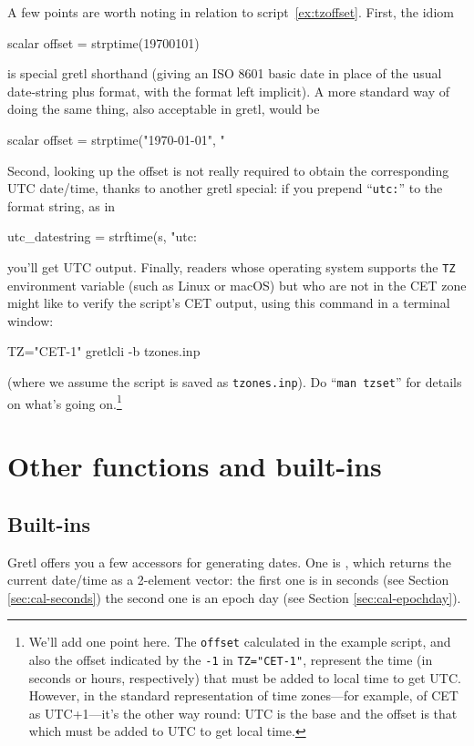 A few points are worth noting in relation to
script~\ref{ex:tzoffset}. First, the idiom
\begin{code}
scalar offset = strptime(19700101)
\end{code}
is special gretl shorthand (giving an ISO 8601 basic date in place of
the usual date-string plus format, with the format left implicit). A more
standard way of doing the same thing, also acceptable in gretl, would
be
\begin{code}
scalar offset = strptime("1970-01-01", "%
\end{code}
Second, looking up the offset is not really required to obtain the
corresponding UTC date/time, thanks to another gretl special: if you
prepend ``\texttt{utc:}'' to the format string, as in
\begin{code}
utc_datestring = strftime(s, "utc:%
\end{code}
you'll get UTC output. Finally, readers whose operating system
supports the \texttt{TZ} environment variable (such as Linux or macOS)
but who are not in the CET zone might like to verify the script's CET
output, using this command in a terminal window:
\begin{code}
TZ="CET-1" gretlcli -b tzones.inp
\end{code}
(where we assume the script is saved as \texttt{tzones.inp}). Do
``\texttt{man tzset}'' for details on what's going on.\footnote{We'll
  add one point here. The \texttt{offset} calculated in the example
  script, and also the offset indicated by the \texttt{-1} in
  \texttt{TZ="CET-1"}, represent the time (in seconds or hours,
  respectively) that must be added to local time to get UTC. However,
  in the standard representation of time zones---for example, of CET
  as UTC+1---it's the other way round: UTC is the base and the offset
  is that which must be added to UTC to get local time.}

\section{Other functions and built-ins}
\label{sec:cal-otherfuncs}

\subsection{Built-ins}
\label{sec:cal-builtins}

Gretl offers you a few accessors for generating dates. One is
, which returns the current date/time as a 2-element
vector: the first one is in seconds (see Section
\ref{sec:cal-seconds}) the second one is an epoch day (see Section
\ref{sec:cal-epochday}).

